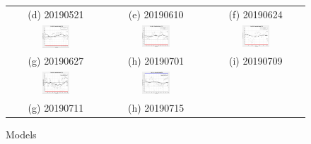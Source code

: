 \begin{figure}
\begin{tabular}{ccc}
    (d) 20190521 & (e) 20190610 & (f) 20190624 \\
    \includegraphics[width=0.3\textwidth]{Figure/20190627_F.JPG} &   \includegraphics[width=0.3\textwidth]{Figure/20190701_F.JPG}  &   \includegraphics[width=0.3\textwidth]{Figure/20190709_F.JPG} \\
    (g) 20190627 & (h) 20190701 & (i) 20190709 \\
    \includegraphics[width=0.3\textwidth]{Figure/20190711_F.JPG} &   \includegraphics[width=0.3\textwidth]{Figure/20190715_F.JPG}  \\
    (g) 20190711 & (h) 20190715 \\


\end{tabular}
\caption{Models}
\end{figure}






